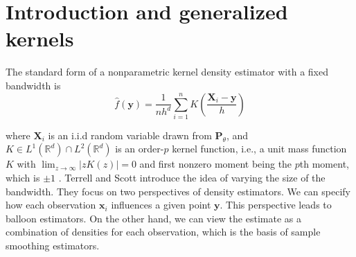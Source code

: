 \documentclass{article}
\newcommand{\R}{\mathbb{R}}
\newcommand{\abs}[1]{\left|#1\right|}
\begin{document}
\section{Introduction and generalized kernels}

The standard form of a nonparametric kernel density estimator with a fixed bandwidth is
\begin{equation}\label{eq:fixed-width-kde}
    \hat{f}(\mathbf{y}) = \frac{1}{nh^d}\sum_{i=1}^nK\left(\frac{\mathbf{X}_i-\mathbf{y}}{h}\right)
\end{equation}

where $\mathbf{X}_i$ is an i.i.d random variable drawn from $\mathbf{P}_\theta$, and $K \in L^1(\R^d) \cap L^2(\R^d)$ is an order-$p$ kernel function, i.e., a unit mass function $K$ with $\lim_{z \to \infty} \abs{zK(z)} = 0$ and first nonzero moment being the $p$th moment, which is $\pm 1$ \cite{vkde}. Terrell and Scott introduce the idea of varying the size of the bandwidth. They focus on two perspectives of density estimators. We can specify how each observation $\mathbf{x}_i$ influences a given point $\mathbf{y}$. This perspective leads to balloon estimators. On the other hand, we can view the estimate as a combination of densities for each observation, which is the basis of sample smoothing estimators.
\end{document}
